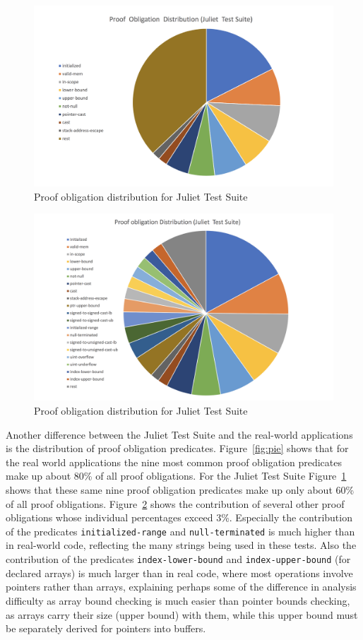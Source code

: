 \documentclass[11pt]{article}
\begin{document}
\begin{figure}[h]
\begin{center}
\includegraphics[width=.8\textwidth]{pie_juliet1.png}
\end{center}
\caption{\label{fig:jpie1}Proof obligation distribution for Juliet Test Suite}
\end{figure}

\begin{figure}[h]
\begin{center}
\includegraphics[width=.8\textwidth]{pie_juliet2.png}
\end{center}
\caption{\label{fig:jpie2}Proof obligation distribution for Juliet Test Suite}
\end{figure}

Another difference between the Juliet Test Suite and the real-world applications is the
distribution of proof obligation predicates. Figure~\ref{fig:pie} shows that for the
real world applications  the nine
most common proof obligation predicates make up about 80\% of all proof obligations.
For the Juliet Test Suite Figure~\ref{fig:jpie1} shows that these same nine proof 
obligation predicates make up only about 60\% of all proof obligations. Figure~\ref{fig:jpie2}
shows the contribution of several other proof obligations whose individual percentages
exceed  3\%. Especially the contribution of the predicates {\tt initialized-range}
and {\tt null-terminated} is much higher than in real-world code, reflecting the many
strings being used in these tests. Also the contribution of the predicates
{\tt index-lower-bound} and {\tt index-upper-bound} (for declared arrays) is much
larger than in real code, where most operations involve pointers rather than arrays,
explaining perhaps some of the difference in analysis difficulty as array bound
checking is much easier than pointer bounds checking, as arrays carry their size
(upper bound) with them, while this upper bound must be separately derived for
pointers into buffers.
\end{document}
